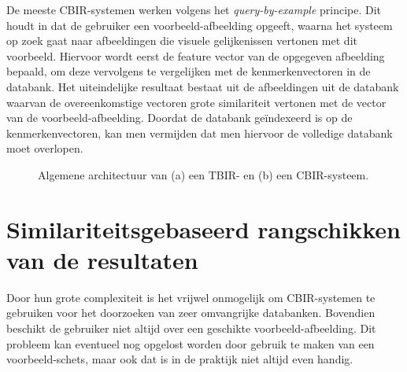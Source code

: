 De meeste CBIR-systemen werken volgens het \emph{query-by-example} principe. Dit houdt in dat de
gebruiker een voorbeeld-afbeelding opgeeft, waarna het systeem op zoek gaat naar afbeeldingen
die visuele gelijkenissen vertonen met dit voorbeeld. Hiervoor wordt eerst de feature vector van
de opgegeven afbeelding bepaald, om deze vervolgens te vergelijken met de kenmerkenvectoren in
de databank. Het uiteindelijke resultaat bestaat uit de afbeeldingen uit de databank 
waarvan de overeenkomstige vectoren grote similariteit vertonen met de vector van de 
voorbeeld-afbeelding. Doordat de databank ge\"indexeerd is op de kenmerkenvectoren, kan men 
vermijden dat men hiervoor de volledige databank moet overlopen.

\begin{figure}[tb]
\begin{center}
\caption{\label{fig:cbir_en_tbir}Algemene architectuur van (a) een TBIR- en 
(b) een CBIR-systeem.}
\end{center}
\end{figure}

\section{Similariteitsgebaseerd rangschikken van de resultaten}

Door hun grote complexiteit is het vrijwel onmogelijk om CBIR-systemen te gebruiken voor het 
doorzoeken van zeer omvangrijke databanken. Bovendien beschikt de gebruiker niet altijd over
een geschikte voorbeeld-afbeelding. Dit probleem kan eventueel nog opgelost worden door gebruik
te maken van een voorbeeld-schets, maar ook dat is in de praktijk niet altijd even handig.

